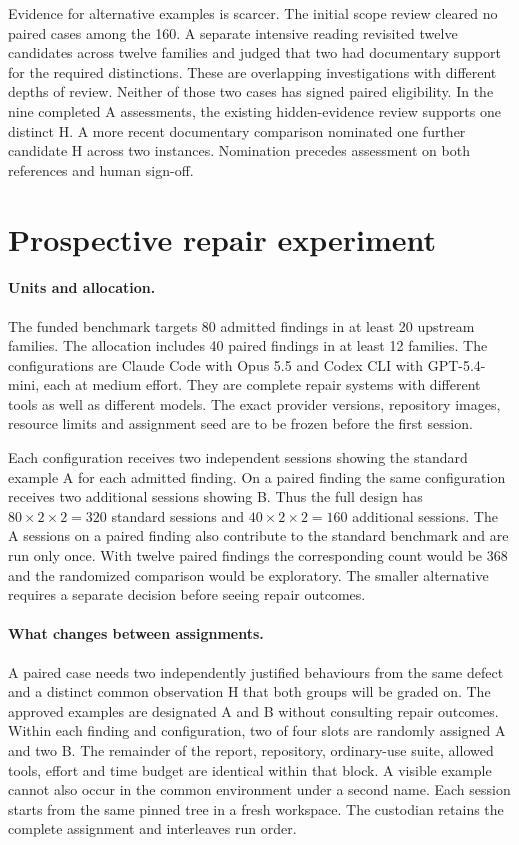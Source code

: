 Evidence for alternative examples is scarcer. The initial scope review cleared no paired cases among the 160. A separate intensive reading revisited twelve candidates across twelve families and judged that two had documentary support for the required distinctions. These are overlapping investigations with different depths of review. Neither of those two cases has signed paired eligibility. In the nine completed A assessments, the existing hidden-evidence review supports one distinct H. A more recent documentary comparison nominated one further candidate H across two instances. Nomination precedes assessment on both references and human sign-off.

\section{Prospective repair experiment}
\label{sec:experiment}
\paragraph{Units and allocation.}
The funded benchmark targets 80 admitted findings in at least 20 upstream families. The allocation includes 40 paired findings in at least 12 families. The configurations are Claude Code with Opus 5.5 and Codex CLI with GPT-5.4-mini, each at medium effort. They are complete repair systems with different tools as well as different models. The exact provider versions, repository images, resource limits and assignment seed are to be frozen before the first session.

Each configuration receives two independent sessions showing the standard example A for each admitted finding. On a paired finding the same configuration receives two additional sessions showing B. Thus the full design has \(80\times2\times2=320\) standard sessions and \(40\times2\times2=160\) additional sessions. The A sessions on a paired finding also contribute to the standard benchmark and are run only once. With twelve paired findings the corresponding count would be 368 and the randomized comparison would be exploratory. The smaller alternative requires a separate decision before seeing repair outcomes.

\paragraph{What changes between assignments.}
A paired case needs two independently justified behaviours from the same defect and a distinct common observation H that both groups will be graded on. The approved examples are designated A and B without consulting repair outcomes. Within each finding and configuration, two of four slots are randomly assigned A and two B. The remainder of the report, repository, ordinary-use suite, allowed tools, effort and time budget are identical within that block. A visible example cannot also occur in the common environment under a second name. Each session starts from the same pinned tree in a fresh workspace. The custodian retains the complete assignment and interleaves run order.

